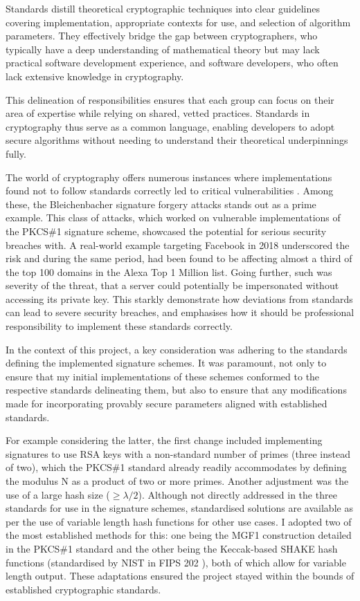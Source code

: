 \documentclass[]{final_report}
\theoremstyle{definition}
\begin{document}
Standards distill theoretical cryptographic techniques into clear guidelines covering implementation, appropriate contexts for use, and selection of algorithm parameters. They effectively bridge the gap between cryptographers, who typically have a deep understanding of mathematical theory but may lack practical software development experience, and software developers, who often lack extensive knowledge in cryptography.

This delineation of responsibilities ensures that each group can focus on their area of expertise while relying on shared, vetted practices. Standards in cryptography thus serve as a common language, enabling developers to adopt secure algorithms without needing to understand their theoretical underpinnings fully.


The world of cryptography offers numerous instances where implementations found not to follow standards correctly led to critical vulnerabilities \cite{4223237, 10.1145/2382196.2382205, 10.1145/2382196.2382204,  bleichenbacher1998chosen}. Among these, the Bleichenbacher signature forgery attacks \cite{finney2006bleichenbacher, kuhn2008variants} stands out as a prime example. This class of attacks, which worked on vulnerable implementations of the PKCS\#1 signature scheme, showcased the potential for serious security breaches with. A real-world example targeting Facebook  \cite{bock2018return} in 2018 underscored the risk and during the same period, had been found to be affecting almost a third of the top 100 domains in the Alexa Top 1 Million list. Going further, such was severity of the threat, that a server could potentially be impersonated without accessing its private key. This starkly demonstrate how deviations from standards can lead to severe security breaches, and emphasises how it should be professional responsibility to implement these standards correctly.


In the context of this project, a key consideration was adhering to the standards defining the implemented signature schemes. It was paramount, not only to ensure that my initial implementations of these schemes conformed to the respective standards delineating them, but also to ensure that any modifications made for incorporating provably secure parameters aligned with established standards.

For example considering the latter, the first change included implementing  signatures to use RSA keys with a non-standard number of primes (three instead of two), which the PKCS\#1 standard already readily accommodates by defining the modulus N as a product of two or more primes. Another adjustment was the use of a large hash size ($\geq \lambda/2$). Although not directly addressed in the three standards for use in the signature schemes, standardised solutions are available as per the use of variable length hash functions for other use cases.  I adopted two of the most established methods for this: one being the MGF1 construction detailed in the PKCS\#1 standard \cite{rfc8017} and the other being the Keccak-based SHAKE hash functions (standardised by NIST in FIPS 202 \cite{1421}), both of which allow for variable length output. These adaptations ensured the project stayed within the bounds of established cryptographic standards. 
\end{document}
